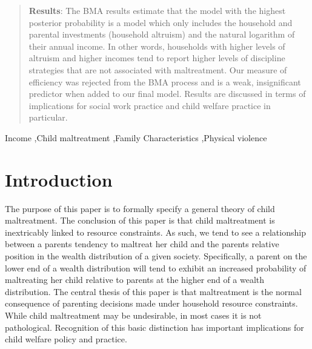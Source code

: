 \documentclass[1p, review]{elsarticle}\usepackage[]{graphicx}\usepackage[]{color}
\makeatletter
\newenvironment{kframe}{%
 \def\at@end@of@kframe{}%
 \ifinner\ifhmode%
  \def\at@end@of@kframe{\end{minipage}}%
  \begin{minipage}{\columnwidth}%
 \fi\fi%
 \def\FrameCommand##1{\hskip\@totalleftmargin \hskip-\fboxsep
 \colorbox{shadecolor}{##1}\hskip-\fboxsep
     \hskip-\linewidth \hskip-\@totalleftmargin \hskip\columnwidth}%
 \MakeFramed {\advance\hsize-\width
   \@totalleftmargin\z@ \linewidth\hsize
   \@setminipage}}%
 {\par\unskip\endMakeFramed%
 \at@end@of@kframe}
\newenvironment{knitrout}{}{} %
\makeatother
\begin{document}
\begin{frontmatter}
\begin{abstract}
  \textbf{Results}: The BMA results estimate that the model with the highest posterior probability is a model which only includes the household and parental investments (household altruism) and the natural logarithm of their annual income. In other words, households with higher levels of altruism and higher incomes tend to report higher levels of discipline strategies that are not associated with maltreatment. Our measure of efficiency was rejected from the BMA process and is a weak, insignificant predictor when added to our final model. Results are discussed in terms of implications for social work practice and child welfare practice in particular. 
  
  \end{abstract}

  \begin{keyword}
  Income \sep Child maltreatment \sep Family Characteristics \sep Physical violence
  \end{keyword}

\end{frontmatter}

\begin{knitrout}
\color{fgcolor}\begin{kframe}


{\ttfamily\noindent\color{warningcolor}{\#\# Warning: package 'tikzDevice' was built under R version 3.0.3\\\#\# Warning: package 'extrafont' was built under R version 3.0.3}}\end{kframe}
\end{knitrout}


\linenumbers

\section{Introduction}

The purpose of this paper is to formally specify a general theory of child maltreatment. The conclusion of this paper is that child maltreatment is inextricably linked to resource constraints. As such, we tend to see a relationship between a parents tendency to maltreat her child and the parents relative position in the wealth distribution of a given society. Specifically, a parent on the lower end of a wealth distribution will tend to exhibit an increased probability of maltreating her child relative to parents at the higher end of a wealth distribution. The central thesis of this paper is that maltreatment is the normal consequence of parenting decisions made under household resource constraints. While child maltreatment may be undesirable, in most cases it is not pathological. Recognition of this basic distinction has important implications for child welfare policy and practice. 
\end{document}
